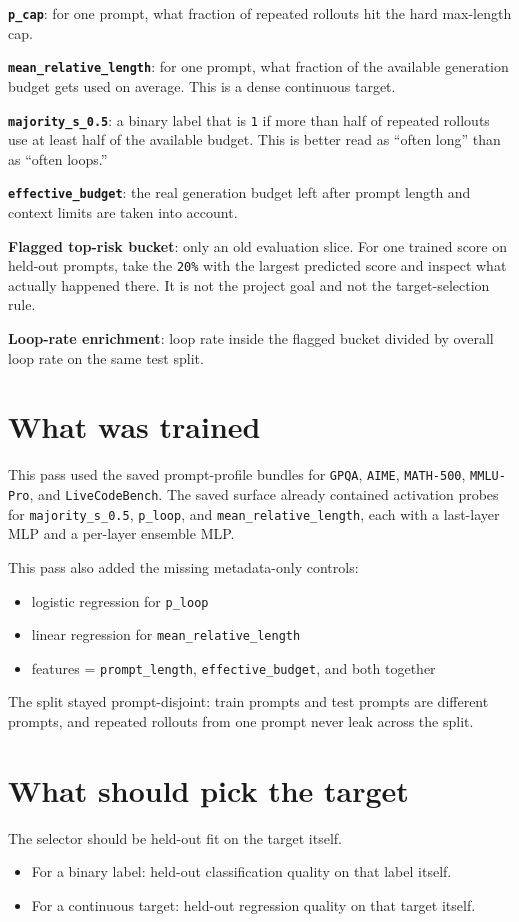 \documentclass[11pt]{article}
\begin{document}
\textbf{\texttt{p\_cap}}: for one prompt, what fraction of repeated rollouts hit
the hard max-length cap.

\textbf{\texttt{mean\_relative\_length}}: for one prompt, what fraction of the
available generation budget gets used on average. This is a dense continuous
target.

\textbf{\texttt{majority\_s\_0.5}}: a binary label that is \texttt{1} if more
than half of repeated rollouts use at least half of the available budget. This
is better read as ``often long'' than as ``often loops.''

\textbf{\texttt{effective\_budget}}: the real generation budget left after
prompt length and context limits are taken into account.

\textbf{Flagged top-risk bucket}: only an old evaluation slice. For one trained
score on held-out prompts, take the \texttt{20\%} with the largest predicted
score and inspect what actually happened there. It is not the project goal and
not the target-selection rule.

\textbf{Loop-rate enrichment}: loop rate inside the flagged bucket divided by
overall loop rate on the same test split.

\section*{What was trained}
This pass used the saved prompt-profile bundles for \texttt{GPQA},
\texttt{AIME}, \texttt{MATH-500}, \texttt{MMLU-Pro}, and
\texttt{LiveCodeBench}. The saved surface already contained activation probes
for \texttt{majority\_s\_0.5}, \texttt{p\_loop}, and
\texttt{mean\_relative\_length}, each with a last-layer MLP and a per-layer
ensemble MLP.

This pass also added the missing metadata-only controls:
\begin{itemize}[leftmargin=1.5em]
\item logistic regression for \texttt{p\_loop}
\item linear regression for \texttt{mean\_relative\_length}
\item features = \texttt{prompt\_length}, \texttt{effective\_budget}, and both
together
\end{itemize}

The split stayed prompt-disjoint: train prompts and test prompts are different
prompts, and repeated rollouts from one prompt never leak across the split.

\section*{What should pick the target}
The selector should be held-out fit on the target itself.
\begin{itemize}[leftmargin=1.5em]
\item For a binary label: held-out classification quality on that label itself.
\item For a continuous target: held-out regression quality on that target
itself.
\end{itemize}
\end{document}
